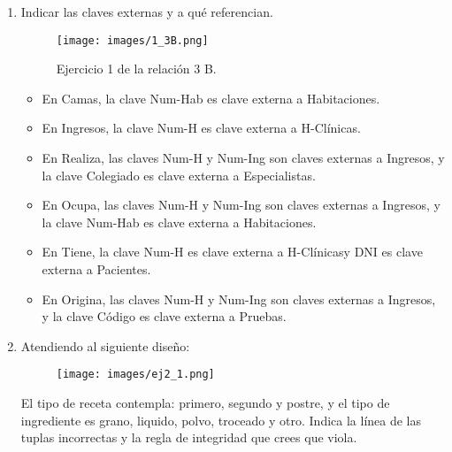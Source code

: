 \begin{enumerate}
    \item Indicar las claves externas y a qué referencian.
    \begin{figure}[H]
        \centering
        \texttt{[image: images/1\_3B.png]}
        \caption{Ejercicio 1 de la relación 3 B.}
        \label{fig:ej1RelB}
    \end{figure}
    \begin{itemize}
        \item En Camas, la clave Num-Hab es clave externa a Habitaciones.
        \item En Ingresos, la clave Num-H es clave externa a H-Clínicas.
        \item En Realiza, las claves Num-H y Num-Ing son claves externas a Ingresos, y la clave Colegiado es clave externa a Especialistas.
        \item En Ocupa, las claves Num-H y Num-Ing son claves externas a Ingresos, y la clave Num-Hab es clave externa a Habitaciones.
        \item En Tiene, la clave Num-H es clave externa a H-Clínicasy DNI es clave externa a Pacientes.
        \item En Origina, las claves Num-H y Num-Ing son claves externas a Ingresos, y la clave Código es clave externa a Pruebas.
    \end{itemize}
    \item Atendiendo al siguiente diseño:
    \begin{figure}[H]
        \centering
        \texttt{[image: images/ej2\_1.png]}
    \end{figure}
    El tipo de receta contempla: primero, segundo y postre, y el tipo de ingrediente es grano,
    liquido, polvo, troceado y otro. Indica la línea de las tuplas incorrectas y la regla de integridad
    que crees que viola.


\end{enumerate}
